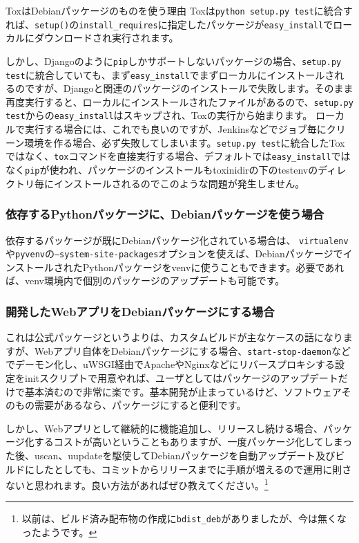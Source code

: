 \documentclass[mingoth,a4paper]{jsarticle}
\begin{document}
{\scriptsize
  \begin{itembox}[l]{ToxはDebianパッケージのものを使う理由}
  Toxは\texttt{python setup.py test}に統合すれば、\texttt{setup()}の\texttt{install\_requires}に指定したパッケージが\texttt{easy\_install}でローカルにダウンロードされ実行されます。

  しかし、Djangoのように\texttt{pip}しかサポートしないパッケージの場合、\texttt{setup.py test}に統合していても、まず\texttt{easy\_install}でまずローカルにインストールされるのですが、Djangoと関連のパッケージのインストールで失敗します。そのまま再度実行すると、ローカルにインストールされたファイルがあるので、\texttt{setup.py test}からの\texttt{easy\_install}はスキップされ、Toxの実行から始まります。
  ローカルで実行する場合には、これでも良いのですが、Jenkinsなどでジョブ毎にクリーン環境を作る場合、必ず失敗してしまいます。\texttt{setup.py test}に統合したToxではなく、\texttt{tox}コマンドを直接実行する場合、デフォルトでは\texttt{easy\_install}ではなく\texttt{pip}が使われ、パッケージのインストールもtoxinidirの下のtestenvのディレクトリ毎にインストールされるのでこのような問題が発生しません。
\end{itembox}
}

\subsubsection{依存するPythonパッケージに、Debianパッケージを使う場合}

依存するパッケージが既にDebianパッケージ化されている場合は、
\texttt{virtualenv}や\texttt{pyvenv}の\texttt{--system-site-packages}オプションを使えば、DebianパッケージでインストールされたPythonパッケージをvenvに使うこともできます。必要であれば、venv環境内で個別のパッケージのアップデートも可能です。

\subsubsection{開発したWebアプリをDebianパッケージにする場合}

これは公式パッケージというよりは、カスタムビルドが主なケースの話になりますが、Webアプリ自体をDebianパッケージにする場合、\texttt{start-stop-daemon}などでデーモン化し、uWSGI経由でApacheやNginxなどにリバースプロキシする設定をinitスクリプトで用意やれば、ユーザとしてはパッケージのアップデートだけで基本済むので非常に楽です。基本開発が止まっているけど、ソフトウェアそのもの需要があるなら、パッケージにすると便利です。

しかし、Webアプリとして継続的に機能追加し、リリースし続ける場合、パッケージ化するコストが高いということもありますが、一度パッケージ化してしまった後、uscan、uupdateを駆使してDebianパッケージを自動アップデート及びビルドにしたとしても、コミットからリリースまでに手順が増えるので運用に則さないと思われます。良い方法があればぜひ教えてください。\footnote{以前は、ビルド済み配布物の作成に\texttt{bdist\_deb}がありましたが、今は無くなったようです。}
\end{document}
